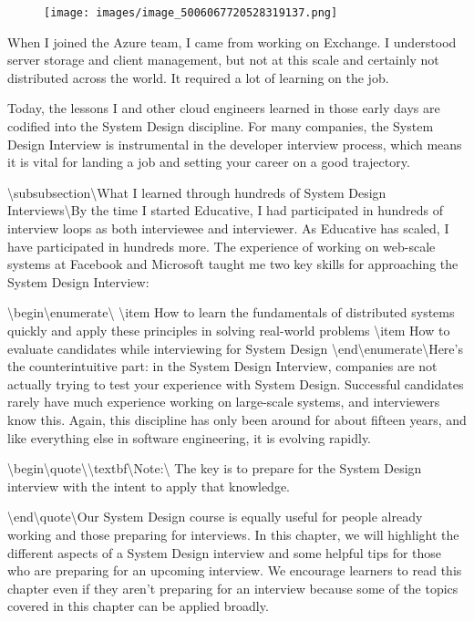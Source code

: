 \begin{figure}[htbp]
    \centering
    \texttt{[image: images/image\_5006067720528319137.png]}
    
\end{figure}

When I joined the Azure team, I came from working on Exchange. I understood server storage and client management, but not at this scale and certainly not distributed across the world. It required a lot of learning on the job.

Today, the lessons I and other cloud engineers learned in those early days are codified into the System Design discipline. For many companies, the System Design Interview is instrumental in the developer interview process, which means it is vital for landing a job and setting your career on a good trajectory.

\textbackslash{}subsubsection\textbackslash{}{What I learned through hundreds of System Design Interviews\textbackslash{}}By the time I started Educative, I had participated in hundreds of interview loops as both interviewee and interviewer. As Educative has scaled, I have participated in hundreds more. The experience of working on web-scale systems at Facebook and Microsoft taught me two key skills for approaching the System Design Interview:

\textbackslash{}begin\textbackslash{}{enumerate\textbackslash{}}
\textbackslash{}item How to learn the fundamentals of distributed systems quickly and apply these principles in solving real-world problems
\textbackslash{}item How to evaluate candidates while interviewing for System Design
\textbackslash{}end\textbackslash{}{enumerate\textbackslash{}}Here’s the counterintuitive part: in the System Design Interview, companies are not actually trying to test your experience with System Design. Successful candidates rarely have much experience working on large-scale systems, and interviewers know this. Again, this discipline has only been around for about fifteen years, and like everything else in software engineering, it is evolving rapidly.

\textbackslash{}begin\textbackslash{}{quote\textbackslash{}}\textbackslash{}textbf\textbackslash{}{Note:\textbackslash{}} The key is to prepare for the System Design interview with the intent to apply that knowledge.

\textbackslash{}end\textbackslash{}{quote\textbackslash{}}Our System Design course is equally useful for people already working and those preparing for interviews. In this chapter, we will highlight the different aspects of a System Design interview and some helpful tips for those who are preparing for an upcoming interview. We encourage learners to read this chapter even if they aren’t preparing for an interview because some of the topics covered in this chapter can be applied broadly.

